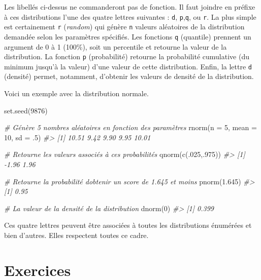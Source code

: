 \documentclass[
]{book}
\newenvironment{Shaded}{}{}
\newcommand{\AttributeTok}[1]{#1}
\newcommand{\CommentTok}[1]{\textit{#1}}
\newcommand{\DecValTok}[1]{#1}
\newcommand{\FloatTok}[1]{#1}
\newcommand{\FunctionTok}[1]{#1}
\newcommand{\NormalTok}[1]{#1}
\begin{document}
Les libellés ci-dessus ne commanderont pas de fonction. Il faut joindre en préfixe à ces distributions l'une des quatre lettres suivantes : \texttt{d}, \texttt{p},\texttt{q}, ou \texttt{r}. La plus simple est certainement \texttt{r} (\emph{random}) qui génère \texttt{n} valeurs aléatoires de la distribution demandée selon les paramètres spécifiés. Les fonctions \texttt{q} (quantile) prennent un argument de 0 à 1 (100\%), soit un percentile et retourne la valeur de la distribution. La fonction \texttt{p} (probabilité) retourne la probabilité cumulative (du minimum jusqu'à la valeur) d'une valeur de cette distribution. Enfin, la lettre \texttt{d} (densité) permet, notamment, d'obtenir les valeurs de densité de la distribution.

Voici un exemple avec la distribution normale.

\begin{Shaded}
\begin{Highlighting}[]
\FunctionTok{set.seed}\NormalTok{(}\DecValTok{9876}\NormalTok{)}

\CommentTok{\# Génère 5 nombres aléatoires en fonction des paramètres}
\FunctionTok{rnorm}\NormalTok{(}\AttributeTok{n =} \DecValTok{5}\NormalTok{, }\AttributeTok{mean =} \DecValTok{10}\NormalTok{, }\AttributeTok{sd =}\NormalTok{ .}\DecValTok{5}\NormalTok{)}
\CommentTok{\#\textgreater{} [1] 10.51  9.42  9.90  9.95 10.01}

\CommentTok{\# Retourne les valeurs associés à ces probabilités}
\FunctionTok{qnorm}\NormalTok{(}\FunctionTok{c}\NormalTok{(.}\DecValTok{025}\NormalTok{,.}\DecValTok{975}\NormalTok{))}
\CommentTok{\#\textgreater{} [1] {-}1.96  1.96}

\CommentTok{\# Retourne la probabilité d\textquotesingle{}obtenir un score de 1.645 et moins}
\FunctionTok{pnorm}\NormalTok{(}\FloatTok{1.645}\NormalTok{)}
\CommentTok{\#\textgreater{} [1] 0.95}

\CommentTok{\# La valeur de la densité de la distribution}
\FunctionTok{dnorm}\NormalTok{(}\DecValTok{0}\NormalTok{)}
\CommentTok{\#\textgreater{} [1] 0.399}
\end{Highlighting}
\end{Shaded}

Ces quatre lettres peuvent être associées à toutes les distributions énumérées et bien d'autres. Elles respectent toutes ce cadre.

\hypertarget{exercice-rudiments}{%
\chapter*{Exercices}\label{exercice-rudiments}}
\end{document}
